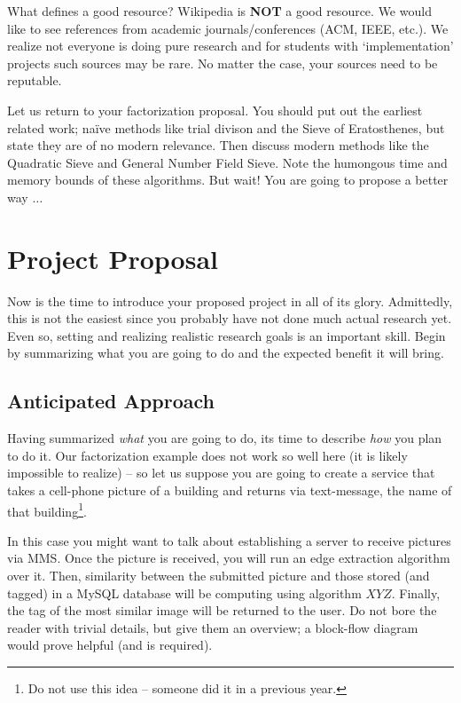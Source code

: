 \documentclass{sig-alternate}
\begin{document}
What defines a good resource? Wikipedia is \textbf{NOT} a good
resource. We would like to see references from academic
journals/conferences (ACM, IEEE, etc.). We realize not everyone is
doing pure research and for students with `implementation' projects
such sources may be rare. No matter the case, your sources need to be
reputable.

Let us return to your factorization proposal. You should put out the
earliest related work; na\"{i}ve methods like trial divison and the
Sieve of Eratosthenes, but state they are of no modern relevance. Then
discuss modern methods like the Quadratic Sieve and General Number
Field Sieve. Note the humongous time and memory bounds of these
algorithms. But wait! You are going to propose a better way $\ldots$

\section{Project Proposal}
\label{sec:project_proposal}
Now is the time to introduce your proposed project in all of its
glory. Admittedly, this is not the easiest since you probably have not
done much actual research yet. Even so, setting and realizing
realistic research goals is an important skill. Begin by summarizing
what you are going to do and the expected benefit it will bring.

\subsection{Anticipated Approach}
\label{subsec:approach}
Having summarized \textit{what} you are going to do, its time to
describe \textit{how} you plan to do it. Our factorization example
does not work so well here (it is likely impossible to realize) -- so
let us suppose you are going to create a service that takes a
cell-phone picture of a building and returns via text-message, the
name of that building\footnote{Do not use this idea -- someone did it
  in a previous year.}.

In this case you might want to talk about establishing a server to
receive pictures via MMS. Once the picture is received, you will run
an edge extraction algorithm over it. Then, similarity between the
submitted picture and those stored (and tagged) in a MySQL database
will be computing using algorithm $XYZ$. Finally, the tag of the most
similar image will be returned to the user. Do not bore the reader
with trivial details, but give them an overview; a block-flow diagram
would prove helpful (and is required).
\end{document}
